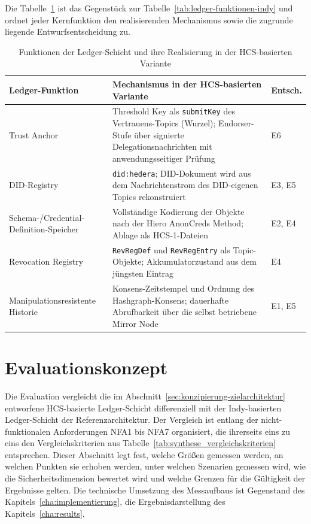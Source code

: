Die Tabelle~\ref{tab:ledger-funktionen-hcs} ist das Gegenstück zur Tabelle~\ref{tab:ledger-funktionen-indy} und ordnet jeder Kernfunktion den realisierenden Mechanismus sowie die zugrunde liegende Entwurfsentscheidung zu.

\begin{table}[htbp]
\renewcommand{\arraystretch}{1.3}
\footnotesize
  \centering
  \caption{Funktionen der Ledger-Schicht und ihre Realisierung in der HCS-basierten Variante}
  \label{tab:ledger-funktionen-hcs}
  \begin{tabular}{p{} p{} p{}}
    \toprule
    \textbf{Ledger-Funktion} & \textbf{Mechanismus in der HCS-basierten Variante} & \textbf{Entsch.} \\
    \midrule
    Trust Anchor & Threshold Key als \texttt{submitKey} des Vertrauens-Topics (Wurzel); Endorser-Stufe über signierte Delegationsnachrichten mit anwendungsseitiger Prüfung & E6 \\
    DID-Registry & \texttt{did:hedera}; DID-Dokument wird aus dem Nachrichtenstrom des DID-eigenen Topics rekonstruiert & E3, E5 \\
    Schema-/Credential-Definition-Speicher & Vollständige Kodierung der Objekte nach der Hiero AnonCreds Method; Ablage als HCS-1-Dateien & E2, E4 \\
    Revocation Registry & \texttt{RevRegDef} und \texttt{RevRegEntry} als Topic-Objekte; Akkumulatorzustand aus dem jüngsten Eintrag & E4 \\
    Manipulationsresistente Historie & Konsens-Zeitstempel und Ordnung des Hashgraph-Konsens; dauerhafte Abrufbarkeit über die selbst betriebene Mirror Node & E1, E5 \\
    \bottomrule
  \end{tabular}
\end{table}

\section{Evaluationskonzept}
\label{sec:konzipierung-evaluationskonzept}

Die Evaluation vergleicht die im Abschnitt~\ref{sec:konzipierung-zielarchitektur} entworfene HCS-basierte Ledger-Schicht differenziell mit der Indy-basierten Ledger-Schicht der Referenzarchitektur. Der Vergleich ist entlang der nicht-funktionalen Anforderungen NFA1 bis NFA7 organisiert, die ihrerseits eins zu eins den Vergleichskriterien aus Tabelle~\ref{tab:synthese_vergleichskriterien} entsprechen. Dieser Abschnitt legt fest, welche Größen gemessen werden, an welchen Punkten sie erhoben werden, unter welchen Szenarien gemessen wird, wie die Sicherheitsdimension bewertet wird und welche Grenzen für die Gültigkeit der Ergebnisse gelten. Die technische Umsetzung des Messaufbaus ist Gegenstand des Kapitels~\ref{cha:implementierung}, die Ergebnisdarstellung des Kapitels~\ref{cha:results}.

